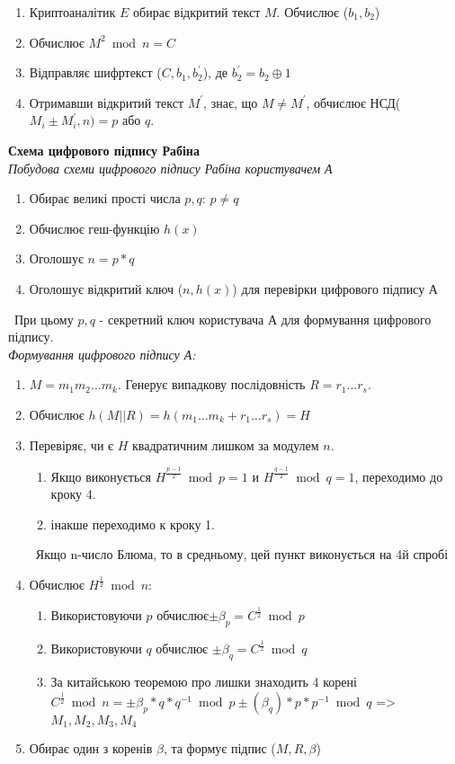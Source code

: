 \begin{enumerate}
        \item  Криптоаналітик $E$ обирає відкритий текст $M$. Обчислює ($b_1,b_2$)
        \item Обчислює $M^2\bmod n=C$
        \item Відправляє шифртекст ($C, b_1,b^{'}_2$), де $b^{'}_2=b_2 \oplus 1$
        \item Отримавши відкритий текст $M^{'}$, знає, що $M\ne M^{'}$, обчислює НСД($M_i\pm M^{'}_i,n)=p$ або $q$.
\end{enumerate}

\textbf{Схема цифрового підпису Рабіна}\\
\textit{Побудова схеми цифрового підпису Рабіна користувачем А}

\begin{enumerate}
        \item Обирає великі прості числа $p,q$: $p\ne q$
        \item Обчислює геш-функцію $h(x)$
        \item Оголошує $n=p*q$
        \item Оголошує відкритий ключ ($n, h(x)$) для перевірки цифрового підпису А     
\end{enumerate}
\ При цьому $p,q$ - секретний ключ користувача А для формування цифрового підпису.\\
\textit{Формування цифрового підпису А:}

\begin{enumerate}
        \item   $M =m_1m_2…m_k$. Генерує випадкову послідовність $R=r_1…r_s$.
        \item   Обчислює $h(M||R)=h(m_1…m_k+r_1…r_s)=H$
        \item Перевіряє, чи є $H$ квадратичним лишком за модулем $n$.
        \begin{enumerate}
                \item Якщо виконується $H^{\frac{p-1}{2}}\bmod p=1$ и $H^{\frac{q-1}{2}}\bmod q=1$, переходимо до кроку 4.
                \item інакше переходимо к кроку 1.
        \end{enumerate}
\ Якщо n-число Блюма, то в средньому, цей пункт виконується на 4й спробі
    \item       Обчислює $H^{\frac{1}{2}}\bmod n$:
    \begin{enumerate}
    \item       Використовуючи $p$ обчислює$\pm \beta_p=C^{\frac{1}{2}}\bmod p$
    \item Використовуючи $q$ обчислює $\pm \beta_q=C^{\frac{1}{2}}\bmod q$
    \item   За китайською теоремою про лишки знаходить 4 корені $C^{\frac{1}{2}}\bmod n={\pm \beta_p*q*q^{-1}\bmod p \pm ( \beta_q)*p*p^{-1}\bmod q}$ =>{ $M_1,M_2,M_3,M_4$}
\end{enumerate}
   \item Обирає один з коренів $\beta$, та формує підпис ($M,R, \beta$)
\end{enumerate}

